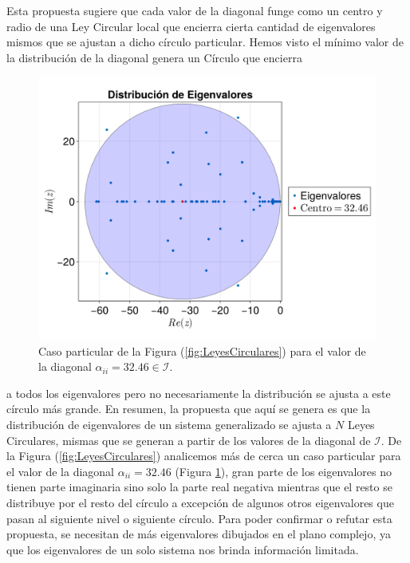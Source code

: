 Esta propuesta sugiere que cada valor de la diagonal funge como un centro y radio de una Ley Circular local que encierra cierta cantidad de eigenvalores mismos que se ajustan a dicho círculo particular. Hemos visto el mínimo valor de la distribución de la diagonal genera un Círculo que encierra 
\begin{figure} \vspace{-30pt} \begin{center}
	\includegraphics[scale=0.13]{../Imagenes/LeyCircularParticular}
	\end{center}
	\vspace{-20pt} 
	\caption{Caso particular de la Figura (\ref{fig:LeyesCirculares}) para el valor de la diagonal $\alpha_{ii}=32.46\in\mathcal{I}$.}
		\vspace{-50pt}
	\label{fig:LeyCircularParticular}
\end{figure}
a todos los eigenvalores pero no necesariamente la distribución se ajusta a este círculo más grande. En resumen, la propuesta que aquí se genera es que la distribución de eigenvalores de un sistema generalizado se ajusta a $N$ Leyes Circulares, mismas que se generan a partir de los valores de la diagonal de $\mathcal{I}$. De la Figura (\ref{fig:LeyesCirculares}) analicemos más de cerca un caso particular para el valor de la diagonal $\alpha_{ii}=32.46$ (Figura \ref{fig:LeyCircularParticular}), gran parte de los eigenvalores no tienen parte imaginaria sino solo la parte real negativa mientras que el resto se distribuye por el resto del círculo a excepción de algunos otros eigenvalores que pasan al siguiente nivel o siguiente círculo. Para poder confirmar o refutar esta propuesta, se necesitan de más eigenvalores dibujados en el plano complejo, ya que los eigenvalores de un solo sistema nos brinda información limitada.

